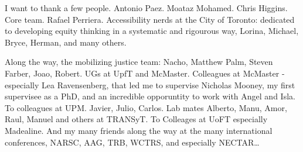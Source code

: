 \documentclass[
11pt, %
oneside, %
english, %
singlespacing, %
]{macthesis} %
\def\blankpage{%
      \clearpage%
      \thispagestyle{empty}%
      \addtocounter{page}{-1}%
      \null%
      \clearpage}
\begin{document}

  \begin{acknowledgements}
  \addchaptertocentry{\acknowledgementname} %
    I want to thank a few people. Antonio Paez. Moataz Mohamed. Chris Higgins. Core team. Rafael Perriera. Accessibility nerds at the City of Toronto: dedicated to developing equity thinking in a systematic and rigourous way, Lorina, Michael, Bryce, Herman, and many others.

    Along the way, the mobilizing justice team: Nacho, Matthew Palm, Steven Farber, Joao, Robert. UGs at UpfT and McMaster. Colleagues at McMaster - especially Lea Ravensenberg, that led me to supervise Nicholas Mooney, my first supervisee as a PhD, and an incredible opporuntity to work with Angel and Isla. To colleagues at UPM. Javier, Julio, Carlos. Lab mates Alberto, Manu, Amor, Raul, Manuel and others at TRANSyT. To Colleages at UoFT especially Madealine. And my many friends along the way at the many international conferences, NARSC, AAG, TRB, WCTRS, and especially NECTAR\ldots{}
  \end{acknowledgements}
\blankpage
\clearpage


\tableofcontents %

\listoffigures %

\listoftables %

\end{document}
